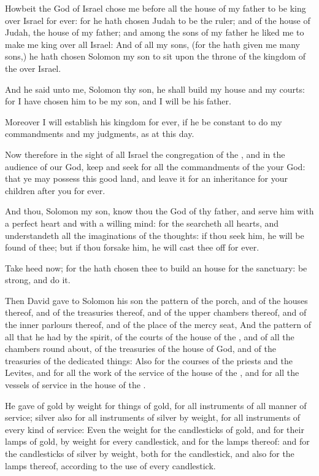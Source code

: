 \Verse Howbeit the \LORD God of Israel chose me before all the house of my father to be king over Israel for ever: for he hath chosen Judah to be the ruler; and of the house of Judah, the house of my father; and among the sons of my father he liked me to make me king over all Israel: \Verse And of all my sons, (for the \LORD hath given me many sons,) he hath chosen Solomon my son to sit upon the throne of the kingdom of the \LORD over Israel.

\Verse And he said unto me, Solomon thy son, he shall build my house and my courts: for I have chosen him to be my son, and I will be his father.

\Verse Moreover I will establish his kingdom for ever, if he be constant to do my commandments and my judgments, as at this day.

\Verse Now therefore in the sight of all Israel the congregation of the \LORD, and in the audience of our God, keep and seek for all the commandments of the \LORD your God: that ye may possess this good land, and leave it for an inheritance for your children after you for ever.

\Verse And thou, Solomon my son, know thou the God of thy father, and serve him with a perfect heart and with a willing mind: for the \LORD searcheth all hearts, and understandeth all the imaginations of the thoughts: if thou seek him, he will be found of thee; but if thou forsake him, he will cast thee off for ever.

\Verse Take heed now; for the \LORD hath chosen thee to build an house for the sanctuary: be strong, and do it.

\Verse Then David gave to Solomon his son the pattern of the porch, and of the houses thereof, and of the treasuries thereof, and of the upper chambers thereof, and of the inner parlours thereof, and of the place of the mercy seat, \Verse And the pattern of all that he had by the spirit, of the courts of the house of the \LORD, and of all the chambers round about, of the treasuries of the house of God, and of the treasuries of the dedicated things: \Verse Also for the courses of the priests and the Levites, and for all the work of the service of the house of the \LORD, and for all the vessels of service in the house of the \LORD.

\Verse He gave of gold by weight for things of gold, for all instruments of all manner of service; silver also for all instruments of silver by weight, for all instruments of every kind of service: \Verse Even the weight for the candlesticks of gold, and for their lamps of gold, by weight for every candlestick, and for the lamps thereof: and for the candlesticks of silver by weight, both for the candlestick, and also for the lamps thereof, according to the use of every candlestick.

